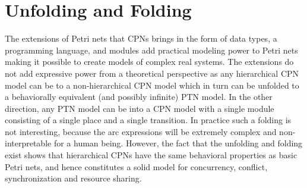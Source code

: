 \section{Unfolding and Folding}

The extensions of Petri nets that CPNs brings in the form of data
types, a programming language, and modules add practical modeling
power to Petri nets making it possible to create models of complex
real systems. The extensions do not add expressive power from a
theoretical perspective as any hierarchical CPN model can be
 to a non-hierarchical CPN model which in turn can
be unfolded to a behaviorally equivalent (and possibly infinite) PTN
model. In the other direction, any PTN model can be 
into a CPN model with a single module consisting of a single place and
a single transition. In practice such a folding is not interesting,
because the arc expressions will be extremely complex and
non-interpretable for a human being. However, the fact that the
unfolding and folding exist shows that hierarchical CPNs have the same
behavioral properties as basic Petri nets, and hence constitutes a
solid model for concurrency, conflict, synchronization and resource
sharing.




